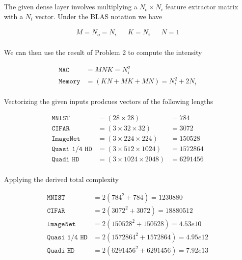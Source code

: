 \documentclass[12pt]{article}
\begin{document}
\section{}

The given dense layer involves multiplying a $N_o \times N_i$ feature extractor
matrix with a $N_i$ vector. Under the BLAS notation we have

\begin{align}
	M = N_o = N_i && K = N_i && N = 1 \\
\end{align}

We can then use the result of Problem 2 to compute the intensity

\begin{align}
	\texttt{MAC}  &= M N K = N_i ^ 2\\
	\texttt{Memory}  &= \left(K N + M K + M N \right) = N_i^2 + 2 N_i \\
\end{align}

Vectorizing the given inputs prodcues vectors of the following lengths

\begin{align}
	\texttt{MNIST}  &= (28 \times 28) &= 784 \\
	\texttt{CIFAR}  &= (3 \times 32 \times 32) &= 3072 \\
	\texttt{ImageNet}  &= (3 \times 224 \times 224) &= 150528 \\
	\texttt{Quasi 1/4 HD}  &= (3 \times 512 \times 1024) &= 1572864 \\
	\texttt{Quadi HD}  &= (3 \times 1024 \times 2048) &= 6291456 \\
\end{align}

Applying the derived total complexity

\begin{align}
	\texttt{MNIST}  &=  2(784^2 + 784) = 1230880\\
	\texttt{CIFAR}  &=   2(3072 ^2 + 3072 ) = 18880512\\
	\texttt{ImageNet}  &=   2(150528 ^2 + 150528 ) = 4.53e10\\
	\texttt{Quasi 1/4 HD}  &=   2(1572864 ^2 + 1572864 ) = 4.95e12\\
	\texttt{Quadi HD}  &=   2(6291456 ^2 + 6291456 ) = 7.92e13\\
\end{align}

\section{}
\end{document}

